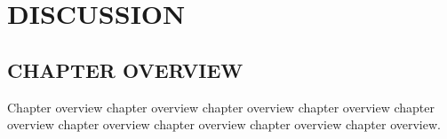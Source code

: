 
\chapter{DISCUSSION}

\section{CHAPTER OVERVIEW}

Chapter overview chapter overview chapter overview chapter overview
chapter overview chapter overview chapter overview chapter overview
chapter overview.

